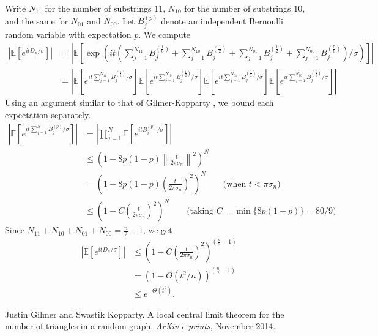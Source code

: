 \documentclass{article}
\newcommand{\p}[1]{\left(#1\right)}
\newcommand{\f}[2]{\frac{#1}{#2}}
\newcommand{\abs}[1]{\left\lvert#1\right\rvert}
\newcommand{\E}{\mathbb{E}}
\newcommand{\norm}[1]{\left\lVert#1\right\rVert}
\newcommand{\s}[1]{\left[#1\right]}
\begin{document}
	Write $N_{11}$ for the number of substrings $11$, $N_{10}$ for the number of substrings $10$, and the same for $N_{01}$ and $N_{00}$. Let $B^{(p)}_j$ denote an independent Bernoulli random variable with expectation $p$. We compute
	\begin{align*}
		\abs{\E \s{e^{it D_n/\sigma}}}
		&= \abs{\E \s{\exp\p{it\p{\sum_{j=1}^{N_{11}} B^{(\f{1}{6})}_j + \sum_{j=1}^{N_{10}} B^{(\f{1}{2})}_j + \sum_{j=1}^{N_{01}} B^{(\f{1}{2})}_j + \sum_{j=1}^{N_{00}} B^{(\f{5}{6})}_j}/\sigma}}} \\
		&= \abs{
			\E \s{e^{it\sum_{j=1}^{N_{11}} B^{(\f{1}{6})}_j/\sigma}}
			\E \s{e^{it\sum_{j=1}^{N_{10}} B^{(\f{1}{2})}_j/\sigma}}
			\E \s{e^{it\sum_{j=1}^{N_{01}} B^{(\f{1}{2})}_j/\sigma}}
			\E \s{e^{it\sum_{j=1}^{N_{00}} B^{(\f{5}{6})}_j/\sigma}}
		}
	\end{align*}
	Using an argument similar to that of Gilmer-Kopparty \cite{GilmerKopparty14}, we bound each expectation separately.
	\begin{align*}
		\abs{\E \s{e^{it \sum_{j=1}^{N} B^{(p)}_j/\sigma}}}
		&= \abs{\prod_{j=1}^{N} \E \s{e^{it B^{(p)}_j/\sigma}}} \\
		&\leq \p{1 - 8p(1-p) \norm{\f{t}{2\pi \sigma_n}}^2}^N \\
		&= \p{1 - 8p(1-p) \p{\f{t}{2\pi \sigma_n}}^2}^N \qquad \text{(when $t < \pi \sigma_n$)} \\
		&\leq \p{1 - C \p{\f{t}{2\pi \sigma_n}}^2}^N \qquad \text{(taking $C = \min{\{8p(1-p)\}} = 80/9$)}
	\end{align*}
	Since $N_{11} + N_{10} + N_{01} + N_{00} = \f{n}{2} - 1$, we get
	\begin{align*}
		\abs{\E \s{e^{it D_n/\sigma}}}
		&\leq \p{1 - C \p{\f{t}{2\pi \sigma_n}}^2}^{(\f{n}{2} - 1)} \\
		&= \p{1 - \Theta(t^2/n)}^{(\f{n}{2} - 1)} \\
		&\leq e^{-\Theta(t^2)}.
	\end{align*}

	\begin{thebibliography}{0}
			Justin Gilmer and Swastik Kopparty.
			A local central limit theorem for the number of triangles in a random graph.
			\emph{ArXiv e-prints},
			November 2014.
	\end{thebibliography}
\end{document}

